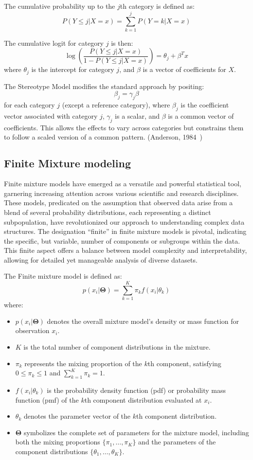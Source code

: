 \documentclass{article}
\begin{document}
The cumulative probability up to the $j$th category is defined as:
\[
P(Y \leq j | X = x) = \sum_{k=1}^{j} P(Y = k | X = x)
\]

The cumulative logit for category $j$ is then:
\[
\log\left(\frac{P(Y \leq j | X = x)}{1 - P(Y \leq j | X = x)}\right) = \theta_j + \beta^T x
\]
where $\theta_j$ is the intercept for category $j$, and $\beta$ is a vector of coefficients for $X$.

The Stereotype Model modifies the standard approach by positing:
\[
\beta_j = \gamma_j \beta
\]
for each category $j$ (except a reference category), where $\beta_j$ is the coefficient vector associated with category $j$, $\gamma_j$ is a scalar, 
and $\beta$ is a common vector of coefficients. This allows the effects to vary across categories but constrains them to follow a scaled version of a common pattern. (Anderson, 1984~\cite{anderson1984regression})


\subsection{Finite Mixture modeling}

Finite mixture models have emerged as a versatile and powerful statistical tool, garnering increasing attention across various scientific and research disciplines. These models, predicated on the assumption that observed data arise from a blend of several probability distributions, each representing a distinct subpopulation, have revolutionized our approach to understanding complex data structures. The designation ``finite'' in finite mixture models is pivotal, indicating the specific, but variable, number of components or subgroups within the data. This finite aspect offers a balance between model complexity and interpretability, allowing for detailed yet manageable analysis of diverse datasets.

The Finite mixture model is defined as:
\begin{equation}
p(x_i|\mathbf{\Theta}) = \sum_{k=1}^{K} \pi_k f(x_i|\theta_k)
\end{equation}
where:
\begin{itemize}
    \item $p(x_i|\mathbf{\Theta})$ denotes the overall mixture model's density or mass function for observation $x_i$.
    \item $K$ is the total number of component distributions in the mixture.
    \item $\pi_k$ represents the mixing proportion of the $k$th component, satisfying $0 \leq \pi_k \leq 1$ and $\sum_{k=1}^{K} \pi_k = 1$.
    \item $f(x_i|\theta_k)$ is the probability density function (pdf) or probability mass function (pmf) of the $k$th component distribution evaluated at $x_i$.
    \item $\theta_k$ denotes the parameter vector of the $k$th component distribution.
    \item $\mathbf{\Theta}$ symbolizes the complete set of parameters for the mixture model, including both the mixing proportions $\{\pi_1, \ldots, \pi_K\}$ and the parameters of the component distributions $\{\theta_1, \ldots, \theta_K\}$.
\end{itemize}
\end{document}
